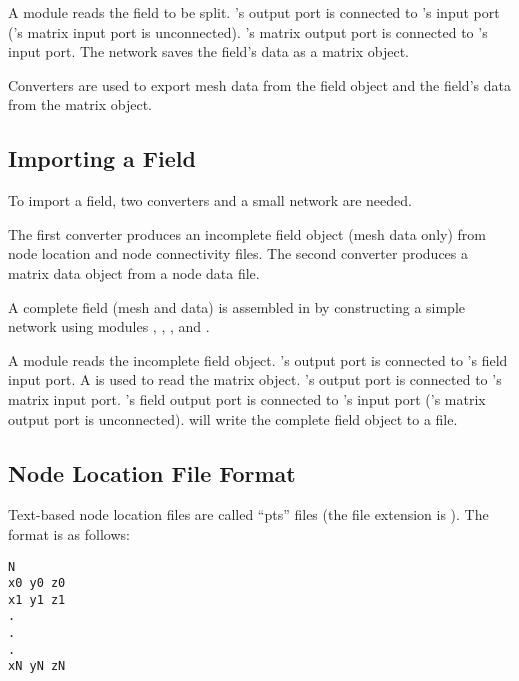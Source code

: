 A  module reads the field to be split.
's output port is connected to
's input port ('s
matrix input port is unconnected).  's
matrix output port is connected to 's input
port.  The network saves the field's data as a matrix object.

Converters are used to export mesh data from the field object and the
field's data from the matrix object.

\subsection{Importing a Field}
\label{sec:import_field}

To import a field, two converters and a small \sr{} network are needed.

The first converter produces an incomplete field object (mesh data
only) from node location and node connectivity files.  The second
converter produces a matrix data object from a node data file.

A complete field (mesh and data) is assembled in \sr{} by
constructing a simple network using modules ,
,  , and
.

A  module reads the incomplete field object.
's output port is connected to
's field input port.  A
 is used to read the matrix object.
's output port is connected to
's matrix input port.
's field output port is connected to
's input port ('s
matrix output port is unconnected).   will write
the complete field object to a file.

\subsection{Node Location File Format}
\label{sec:node_loc_fmt}

Text-based node location files are called ``pts'' files (the file
extension is ).  The format is as follows:

\begin{verbatim}
N
x0 y0 z0
x1 y1 z1
.
.
.
xN yN zN
\end{verbatim}

